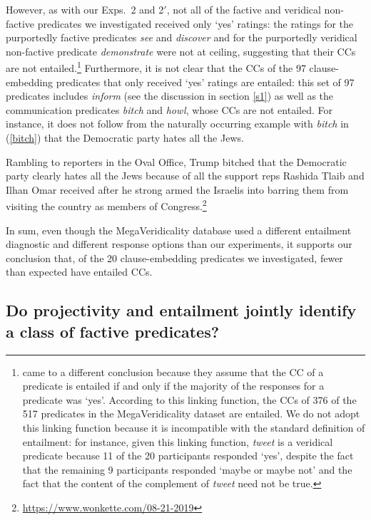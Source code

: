 \documentclass[11pt,fleqn]{article}
\newcommand{\6}{\mbox{$[\hspace*{-.6mm}[$}}
\newcommand{\9}{\mbox{$]\hspace*{-.6mm}]$}}
\begin{document}
{However, as with our Exps.~2 and 2$'$, not all of the factive and veridical non-factive predicates we investigated received only `yes' ratings: the ratings for the purportedly factive predicates {\em see} and {\em discover} and for the purportedly veridical non-factive predicate {\em demonstrate} were not at ceiling, suggesting that their CCs are not entailed.\footnote{\label{mv}\citet{white-rawlins-nels2018} came to a different conclusion because they assume that the CC of a predicate is entailed if and only if the majority of the responses for a predicate was `yes'. According to this linking function, the CCs of 376 of the 517 predicates in the MegaVeridicality dataset are entailed. We do not adopt this linking function because it is incompatible with the standard definition of entailment: for instance, given this linking function, {\em tweet} is a veridical predicate because 11 of the 20 participants responded `yes', despite the fact that the remaining 9 participants responded `maybe or maybe not' and the fact that the content of the complement of {\em tweet} need not be true.} Furthermore, it is not clear that the CCs of the 97 clause-embedding predicates that only received `yes' ratings are entailed: this set of 97 predicates includes {\em inform} (see the discussion in section \ref{s1}) as well as the communication predicates {\em bitch} and {\em howl}, whose CCs are not entailed. For instance, it does not follow from the naturally occurring example with {\em bitch} in (\ref{bitch}) that the Democratic party hates all the Jews.

\begin{exe}
\ex\label{bitch} Rambling to reporters in the Oval Office, Trump bitched that the Democratic party clearly hates all the Jews because of all the support reps Rashida Tlaib and Ilhan Omar received after he strong armed the Israelis into barring them from visiting the country as members of Congress.\footnote{\url{https://www.wonkette.com/08-21-2019}}
\end{exe}
In sum, even though the MegaVeridicality database used a different entailment diagnostic and different response options than our experiments, it supports our conclusion that, of the 20 clause-embedding predicates we investigated, fewer than expected have entailed CCs. 
 
\subsection{Do projectivity and entailment jointly identify a class of factive predicates?}\label{s34}

}
\end{document}

